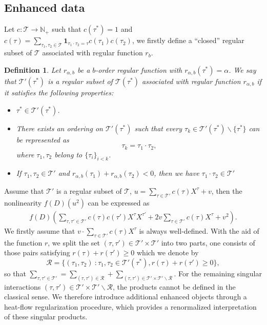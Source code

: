 \documentclass{article}
\newtheorem{definition}{Definition}[section]
\numberwithin{equation}{section}
\newcommand{\m}{\mathbb}
\newcommand{\ml}{\mathcal}
\begin{document}
\subsection{Enhanced data}
 Let $c:\ml T\to \m N_+$ such that $c(\tau^*)=1$ and $c(\tau)=\sum_{\tau_1,\tau_2\in\ml T}\textbf{1}_{\tau_1\cdot\tau_2=\tau}c(\tau_1)c(\tau_2)$,  we firstly define a ``closed'' regular subset of $\ml T$ associated with regular function $r_b$.
 \begin{definition}
     Let $r_{\alpha,b}$ be a $b$-order regular function with $r_{\alpha,b}(\tau^*)=\alpha$. We say that $\ml T'(\tau^*)$ is a regular subset of $\ml T(\tau^*)$  associated with regular function $r_{\alpha,b}$  if it satisfies the following properties:
\begin{itemize}
    \item {$\tau^*\in\ml T'(\tau^*)$.}
    \item {There exists an ordering on $\ml T'(\tau^*)$ such that every $\tau_k\in\ml T'(\tau^*)\backslash \{\tau^*\}$ can be represented as
    \[
    \tau_k=\tau_1\cdot\tau_2,
    \]
    where $\tau_1,\tau_2$ belong to $\{\tau_i\}_{i<k}$.}
    \item {If $\tau_1,\tau_2\in\ml T'$ and $r_{\alpha,b}(\tau_1)+r_{\alpha,b}(\tau_2)<0$, then we have $\tau_1\cdot\tau_2\in\ml T'$}
\end{itemize}
 \end{definition}
 Assume that $\ml T'$ is a regular subset of $\ml T$, $u=\sum_{\tau\in \ml T'}c(\tau)X^\tau+v$, then the nonlinearity $f(D)(u^2)$ can be expressed as 
\begin{align*}
   f(D)(\sum_{\tau,\tau'\in \ml T'}c(\tau)c(\tau')X^\tau X^{\tau'}+2v\sum_{\tau\in \ml T'}c(\tau)X^\tau+v^2).
\end{align*}
We firstly assume that $v\cdot\sum_{\tau\in \ml T'}c(\tau)X^\tau$ is always well-defined. With the aid of the function  $r$, we split the set  $(\tau,\tau')\in\ml T'\times\ml T'$ into two parts, one consists of those pairs satisfying  $r(\tau)+r(\tau')\geq0$ which we denote by
\begin{equation}
    \ml R=\{(\tau_1,\tau_2)\::\tau_1,\tau_2\in\ml T'(\tau^*),r(\tau)+r(\tau')\geq0\},
\end{equation}
so that $\sum_{\tau,\tau'\in\ml T'}=\sum_{(\tau,\tau')\in \ml R}+\sum_{(\tau,\tau')\in\ml T'\times \ml T'\backslash\ml R}$. For the remaining singular interactions $(\tau,\tau')\in \ml T'\times \ml T'\backslash\ml R$, the products cannot be defined in the classical sense. We therefore introduce additional enhanced objects through a heat-flow regularization procedure, which provides a renormalized interpretation of these singular products.
\end{document}
